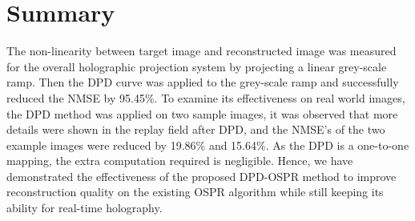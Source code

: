 \section{Summary}
The non-linearity between target image and reconstructed image was measured for the overall holographic projection system by projecting a linear grey-scale ramp. Then the DPD curve was applied to the grey-scale ramp and successfully reduced the NMSE by 95.45\%. To examine its effectiveness on real world images, the DPD method was applied on two sample images, it was observed that more details were shown in the replay field after DPD, and the NMSE's of the two example images were reduced by 19.86\% and 15.64\%. As the DPD is a one-to-one mapping, the extra computation required is negligible. Hence, we have demonstrated the effectiveness of the proposed DPD-OSPR method to improve reconstruction quality on the existing OSPR algorithm while still keeping its ability for real-time holography.




